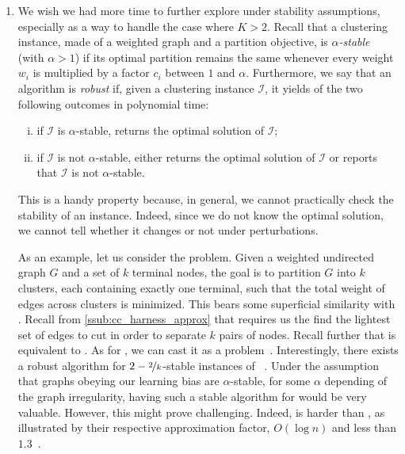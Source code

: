 \begin{enumerate}[1)]
	\item We wish we had more time to further explore \pcc{} under stability assumptions, especially
		as a way to handle the case where $K>2$. Recall that a clustering instance, made of a weighted
		graph and a partition objective, is \emph{$\alpha$-stable} (with $\alpha>1$) if its optimal
		partition remains the same whenever every weight $w_i$ is multiplied by a factor $c_i$ between
		$1$ and $\alpha$. Furthermore, we say that an algorithm is \emph{robust} if, given a clustering
		instance $\mathcal{I}$, it yields of the two following outcomes in polynomial time:
		\begin{enumerate}[(i),nosep]
			\item if $\mathcal{I}$ is $\alpha$-stable, returns the optimal solution of $\mathcal{I}$;
			\item if $\mathcal{I}$ is not $\alpha$-stable, either returns the optimal solution of
				$\mathcal{I}$ or reports that $\mathcal{I}$ is not $\alpha$-stable.
		\end{enumerate}
		This is a handy property because, in general, we cannot practically check the stability of an
		instance. Indeed, since we do not know the optimal solution, we cannot tell whether it changes
		or not under perturbations.

		As an example, let us consider the \minmc{} problem. Given a weighted undirected graph $G$ and a
		set of $k$ terminal nodes, the goal is to partition $G$ into $k$ clusters, each containing
		exactly one terminal, such that the total weight of edges across clusters is minimized. This
		bears some superficial similarity with \mmc{}. Recall from \autoref{ssub:cc_harness_approx} that
		\mmc{} requires us the find the lightest set of edges to cut in order to separate $k$ pairs of
		nodes.  Recall further that \mmc{} is equivalent to \pcc{}. As for \minmc{}, we can cast it as a
		\pcc{} problem~\autocite[Theorem 24]{Bansal2004}. Interestingly, there exists a robust
		algorithm for $2-\nicefrac{2}{k}$-stable instances of \minmc{}~\autocite{StableCC17}.  Under the
		assumption that graphs obeying our learning bias are $\alpha$-stable, for some $\alpha$
		depending of the graph irregularity, having such a stable algorithm for \mmc{} would be very
		valuable.  However, this might prove challenging. Indeed, \mmc{} is harder than \minmc{}, as
		illustrated by their respective approximation factor, $O(\log n)$ and less than
		$1.3$~\autocite{minmcApprox17}.

\end{enumerate}
